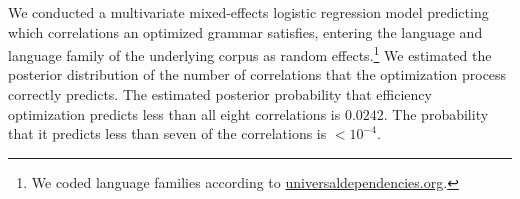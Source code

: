 \documentclass[9pt,twocolumn,twoside,lineno]{pnas-new}
\begin{document}
We conducted a multivariate mixed-effects logistic regression model predicting which correlations an optimized grammar satisfies, entering the language and language family of the underlying corpus as random effects.\footnote{We coded language families according to \url{universaldependencies.org}.}
We estimated the posterior distribution of the number of correlations that the optimization process correctly predicts.
The estimated posterior probability that efficiency optimization predicts less than all eight correlations is $0.0242$. The probability that it predicts less than seven of the correlations is $<10^{-4}$.
\end{document}

